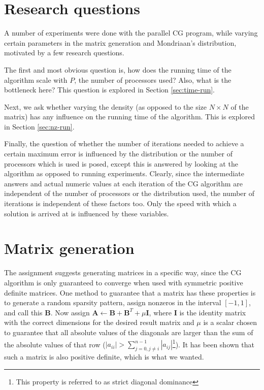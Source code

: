 \documentclass[a4paper]{article}
\newcommand{\mat}[1]{\ensuremath{\boldsymbol{#1}}}
\begin{document}
\section{Research questions}

A number of experiments were done with the parallel CG program, while
varying certain parameters in the matrix generation and Mondriaan's distribution,
motivated by a few research questions.

The first and most obvious question is, how does the running time of the algorithm
scale with $P$, the number of processors used? Also, what is the
bottleneck here? This question is explored in Section
\ref{sec:time-run}.

Next, we ask whether varying the density (as opposed to the size $N\times N$ of the matrix) has
any influence on the running time of the algorithm. This is explored in Section \ref{sec:nz-run}.

Finally, the question of whether the number of iterations needed to achieve a certain maximum
error is influenced by the distribution or the number of processors which is used is posed, except
this is answered by looking at the algorithm as opposed to running experiments. Clearly, since the
intermediate answers and actual numeric values at each iteration of the CG algorithm are independent
of the number of processors or the distribution used, the number of iterations is independent of these
factors too. Only the speed with which a solution is arrived at is influenced by these variables.

\section{Matrix generation}\label{sec:matrix-generation}

The assignment suggests generating matrices in a specific way, since the CG
algorithm is only guaranteed to converge when used with symmetric positive
definite matrices. One method to guarantee that a matrix has these properties
is to generate a random sparsity pattern, assign nonzeros in the interval
$[-1,1]$, and call this \mat B.  Now assign $\mat A \leftarrow \mat B + \mat
B^T + \mu \mat I$, where \mat I is the identity matrix with the correct
dimensions for the desired result matrix and $\mu$ is a scalar chosen to
guarantee that all absolute values of the diagonals are larger than the sum of
the absolute values of that row ($|a_{ii}| > \sum_{j=0,j\neq i}^{n-1}
|a_{ij}|$\footnote{This property is referred to as strict diagonal dominance}).
It has been shown that such a matrix is also positive definite, which is what
we wanted.
\end{document}
